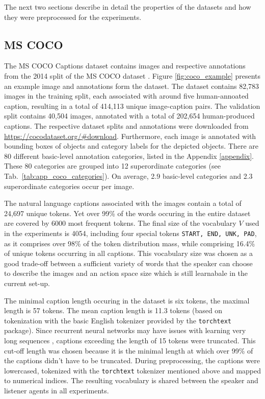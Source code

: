 The next two sections describe in detail the properties of the datasets and how they were preprocessed for the experiments.

\subsection{MS COCO}
\label{ds:coco}
The MS COCO Captions dataset \parencite{chen2015microsoft} contains images and respective annotations from the 2014 split of the MS COCO dataset \parencite{lin2014microsoft}. Figure \ref{fig:coco_example} presents an example image and annotations form the dataset. The dataset contains 82,783 images in the training split, each associated with around five human-annoated caption, resulting in a total of 414,113 unique image-caption pairs. The validation split contains 40,504 images, annotated with a total of 202,654 human-produced captions. The respective dataset splits and annotations were downloaded from \url{https://cocodataset.org/#download}.
Furthermore, each image is annotated with bounding boxes of objects and category labels for the depicted objects. There are 80 different basic-level annotation categories, listed in the Appendix \ref{appendix}. These 80 categories are grouped into 12 superordinate categories (see Tab.~\ref{tab:app_coco_categories}).
On average, 2.9 basic-level categories and 2.3 superordinate categories occur per image.

The natural language captions associated with the images contain a total of 24,697 unique tokens. Yet over 99\% of the words occuring in the entire dataset are covered by 6000 most frequent tokens. 
The final size of the vocabulary $V$ used in the experiments is 4054, including four special tokens \texttt{START, END, UNK, PAD}, as it comprises over 98\% of the token distribution mass, while comprising 16.4\% of unique tokens occurring in all captions. This vocabulary size was chosen as a good trade-off between a sufficient variety of words that the speaker can choose to describe the images and an action space size which is still learnabale in the current set-up. 

The minimal caption length occuring in the dataset is six tokens, the maximal length is 57 tokens. The mean caption length is 11.3 tokens (based on tokenization with the basic English tokenizer provided by the \texttt{torchtext} package). Since recurrent neural networks may have issues with learning very long sequences \parencite[e. g.,][]{jaeger2002tutorial}, captions exceeding the length of 15 tokens were truncated. This cut-off length was chosen because it is the minimal length at which over 99\% of the captions didn't have to be truncated. %
During preprocessing, the captions were lowercased, tokenized with the \texttt{torchtext} tokenizer mentioned above and mapped to numerical indices.  The resulting vocabulary is shared between the speaker and listener agents in all experiments. 

